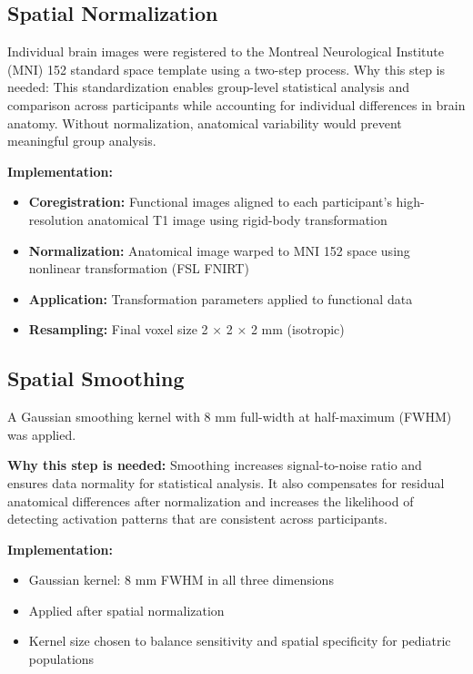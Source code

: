 \documentclass[12pt, a4paper]{article}
\begin{document}
\noindent
\subsection{Spatial Normalization}
Individual brain images were registered to the Montreal Neurological Institute (MNI) 152 standard space template using a two-step process.
Why this step is needed: This standardization enables group-level statistical analysis and comparison across participants while accounting for individual differences in brain anatomy. Without normalization, anatomical variability would prevent meaningful group analysis.

\textbf{Implementation:} 
\begin{itemize}
\item \textbf{Coregistration:} Functional images aligned to each participant's high-resolution anatomical T1 image using rigid-body transformation
\item \textbf{Normalization:} Anatomical image warped to MNI 152 space using nonlinear transformation (FSL FNIRT)
\item \textbf{Application:} Transformation parameters applied to functional data
\item \textbf{Resampling:} Final voxel size 2 × 2 × 2 mm (isotropic)
\end{itemize}


\subsection{Spatial Smoothing}
A Gaussian smoothing kernel with 8 mm full-width at half-maximum (FWHM) was applied.

\vspace{0.5\baselineskip}
\noindent
\textbf{Why this step is needed:} Smoothing increases signal-to-noise ratio and ensures data normality for statistical analysis. It also compensates for residual anatomical differences after normalization and increases the likelihood of detecting activation patterns that are consistent across participants.

\noindent
\textbf{Implementation:} 
\begin{itemize}
\item Gaussian kernel: 8 mm FWHM in all three dimensions
\item Applied after spatial normalization
\item Kernel size chosen to balance sensitivity and spatial specificity for pediatric populations
\end{itemize}
\end{document}
